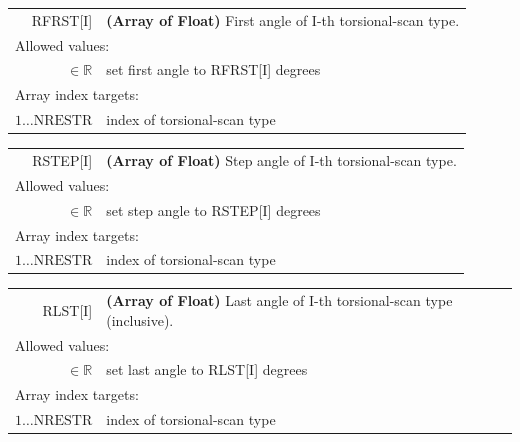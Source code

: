 \documentclass[10pt,a4paper,openany]{memoir}
\numberwithin{equation}{section}
\begin{document}
{
\begin{tabular}{r@{ : }l}
\label{descr:rfrst}
     RFRST[I]&\textbf{(Array of Float)} First angle of I-th torsional-scan type.                                                                \\ 
\multicolumn{2}{l}{Allowed values:} \\ 
\(\in\mathbb{R}\)&set first angle to RFRST[I] degrees                                                                  \\ 
\multicolumn{2}{l}{Array index targets:} \\ 
\(1\ldots \text{NRESTR} \)& index of torsional-scan type \\
\end{tabular}
\vspace{1ex}
}

{
\begin{tabular}{r@{ : }l}
\label{descr:rstep}
     RSTEP[I]&\textbf{(Array of Float)} Step angle of I-th torsional-scan type.                                                                    \\ 
\multicolumn{2}{l}{Allowed values:} \\ 
\(\in\mathbb{R}\)&set step angle to RSTEP[I] degrees                                                                      \\ 
\multicolumn{2}{l}{Array index targets:} \\ 
\(1 \ldots \text{NRESTR} \)&index of torsional-scan type                                                                      \\ 
\end{tabular}
\vspace{1ex}
}

{
\begin{tabular}{r@{ : }l}
\label{descr:rlst}
      RLST[I]&\textbf{(Array of Float)} Last angle of I-th torsional-scan type (inclusive).                                                        \\ 
\multicolumn{2}{l}{Allowed values:} \\ 
\(\in\mathbb{R}\)&set last angle to RLST[I] degrees                                                                       \\ 
\multicolumn{2}{l}{Array index targets:} \\ 
\(1 \ldots \text{NRESTR} \)&index of torsional-scan type                                                                      \\ 
\end{tabular}
\vspace{1ex}
}
\end{document}
